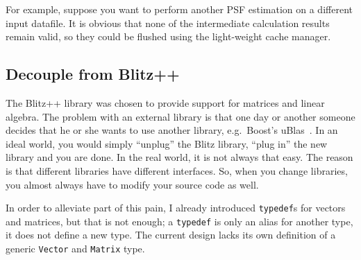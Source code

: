 \documentclass[a4paper]{article}
\begin{document}
For example, suppose you want to perform another PSF estimation on a different
input datafile. It is obvious that none of the intermediate calculation
results remain valid, so they could be flushed using the light-weight cache
manager.




\subsection{Decouple from Blitz++}
\label{subsec:future-blitz}
The Blitz++ library was chosen to provide support for matrices and linear
algebra. The problem with an external library is that one day or another
someone decides that he or she wants to use another library, e.g.\ Boost's
uBlas~\cite{ublas}. In an ideal world, you would simply ``unplug'' the Blitz
library, ``plug in'' the new library and you are done. In the real world, it
is not always that easy. The reason is that different libraries have different
interfaces. So, when you change libraries, you almost always have to modify
your source code as well.

In order to alleviate part of this pain, I already introduced {\tt typedef}s
for vectors and matrices, but that is not enough; a {\tt typedef} is only an
alias for another type, it does not define a new type. The current design
lacks its own definition of a generic {\tt Vector} and {\tt Matrix} type. 
\end{document}
